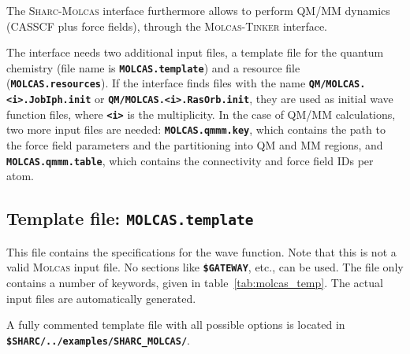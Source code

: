 \documentclass[a4paper,10pt,DIV=15,openany]{scrbook}
\newcommand{\sharc}{\textsc{Sharc}}
\newcommand{\ttt}[1]{\textbf{\texttt{#1}}}
\begin{document}
The \sharc-\textsc{Molcas} interface furthermore allows to perform QM/MM dynamics (CASSCF plus force fields), through the \textsc{Molcas}-\textsc{Tinker} interface. 

The interface needs two additional input files, a template file for the quantum chemistry (file name is \ttt{MOLCAS.template}) and a resource file (\ttt{MOLCAS.resources}). If the interface finds files with the name \ttt{QM/MOLCAS.<i>.JobIph.init} or \ttt{QM/MOLCAS.<i>.RasOrb.init}, they are used as initial wave function files, where \ttt{<i>} is the multiplicity. In the case of QM/MM calculations, two more input files are needed: \ttt{MOLCAS.qmmm.key}, which contains the path to the force field parameters and the partitioning into QM and MM regions, and \ttt{MOLCAS.qmmm.table}, which contains the connectivity and force field IDs per atom.

\subsection{Template file: \ttt{MOLCAS.template}}

This file contains the specifications for the wave function. Note that this is not a valid \textsc{Molcas} input file. No sections like \ttt{\$GATEWAY}, etc., can be used. The file only contains a number of keywords, given in table~\ref{tab:molcas_temp}.
The actual input files are automatically generated.

A fully commented template file with all possible options is located in \ttt{\$SHARC/../examples/SHARC\_MOLCAS/}.
\end{document}
